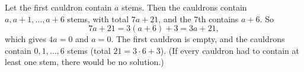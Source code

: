 Let the first cauldron contain $a$ stems. Then the cauldrons contain $a,a+1,\dots,a+6$ stems, with total $7a+21$, and the $7$th contains $a+6$. So
\[7a+21=3(a+6)+3=3a+21,\]
which gives $4a=0$ and $a=\boxed{0}$. The first cauldron is empty, and the cauldrons contain $0,1,\dots,6$ stems (total $21=3\cdot6+3$). (If every cauldron had to contain at least one stem, there would be no solution.)
